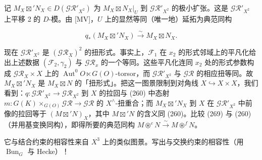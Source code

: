 记 $M_X\boxtimes'N_X\in D(\mathcal{GR}'_{X^{2}})$ 为 $M_X\boxtimes N_X|_U$ 到 $\mathcal{GR}'_{X^{2}}$ 的极小扩张。这是 $\mathcal{GR}'_{X^{2}}$ 上平移 2 的 $D$-模。由 [MV]，$U$ 上的显然等同（唯一地）延拓为典范同构

\begin{equation}\tag{269}
q_{*}(M_X\boxtimes'N_X)\xrightarrow{\sim}M_X\boxtimes N_X.
\end{equation}

现在 $\mathcal{GR}'_{X^{2}}$ 是 $(\mathcal{GR}_X)^{2}$ 的扭形式。事实上，$\mathcal{F}_1$ 在 $x_2$ 的形式邻域上的平凡化给出上述数据 $(\mathcal{F}_2,\gamma_2)$ 与 $\mathcal{GR}_x$ 的一个等同。这些平凡化连同 $x_2$ 处的形式参数构成 $\mathcal{GR}_X\times X$ 上的 $\operatorname{Aut}^{0}O\ltimes G(O)$-torsor，而 $\mathcal{GR}'_{X^{2}}$ 与 $\mathcal{GR}$ 的相应扭等同。故 $M_X\boxtimes'N_X$ 是 $M_X\boxtimes N$ 的「扭形式」。把这一图景限制到对角线 $X\hookrightarrow X\times X$，我们看到：$q:\mathcal{GR}'_{X^{2}}\to\mathcal{GR}_{X^{2}}$ 到 $X$ 的拉回与 (260) 中态射 $m:G(K)\times_{G(O)}\mathcal{GR}\to\mathcal{GR}$ 的 $X^{\wedge}$-扭重合；而 $M_X\boxtimes'N_X$ 到 $X$ 在 $\mathcal{GR}'_{X^{2}}$ 中前像的拉回等于 $(M\boxtimes'N)_X$，其中 $M\boxtimes'N$ 的含义同 (260)。比较 (269) 与 (260)（并用基变换同构），即得所要的典范同构 $M\circledast^{c}N\xrightarrow{\sim}M\circledast^{f}N$。

它与结合约束的相容性来自 $X^{3}$ 上的类似图景。写出与交换约束的相容性（用 $\operatorname{Bun}_G$ 与 Hecke）！
